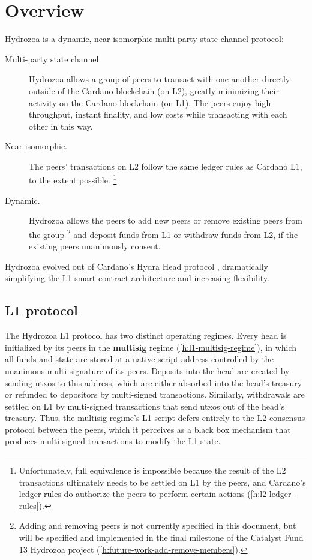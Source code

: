 \documentclass[../hydrozoa.tex]{subfiles}
\begin{document}
\chapter*{Overview}%
\label{h:overview-introduction}%
%

Hydrozoa is a dynamic, near-isomorphic multi-party state channel protocol:
\begin{description}
  \item[Multi-party state channel.] Hydrozoa allows a group of peers to transact with one another directly outside of the Cardano blockchain (on L2), greatly minimizing their activity on the Cardano blockchain (on L1).
    The peers enjoy high throughput, instant finality, and low costs while transacting with each other in this way.
  \item[Near-isomorphic.] The peers' transactions on L2 follow the same ledger rules as Cardano L1, to the extent possible.%
    \footnote{Unfortunately, full equivalence is impossible because the result of the L2 transactions ultimately needs to be settled on L1 by the peers, and Cardano's ledger rules do authorize the peers to perform certain actions (\cref{h:l2-ledger-rules}).}
  \item[Dynamic.] Hydrozoa allows the peers to add new peers or remove existing peers from the group%
    \footnote{Adding and removing peers is not currently specified in this document, but will be specified and implemented in the final milestone of the Catalyst Fund 13 Hydrozoa project \citep{FlerovskyCatalystMilestonesHydrozoa2024} (\cref{h:future-work-add-remove-members}).}
    and deposit funds from L1 or withdraw funds from L2, if the existing peers unanimously consent.
\end{description}
Hydrozoa evolved out of Cardano's Hydra Head protocol \citep{NagelEtAlHydraHeadV1Specification2024}, dramatically simplifying the L1 smart contract architecture and increasing flexibility.

\section*{L1 protocol}%
\label{h:overview-l1-protocol}%
%

The Hydrozoa L1 protocol has two distinct operating regimes.
Every head is initialized by its peers in the \textbf{multisig} regime (\cref{h:l1-multisig-regime}), in which all funds and state are stored at a native script address controlled by the unanimous multi-signature of its peers.
Deposits into the head are created by sending utxos to this address, which are either absorbed into the head's treasury or refunded to depositors by multi-signed transactions.
Similarly, withdrawals are settled on L1 by multi-signed transactions that send utxos out of the head's treasury.
Thus, the multisig regime's L1 script defers entirely to the L2 consensus protocol between the peers, which it perceives as a black box mechanism that produces multi-signed transactions to modify the L1 state.
\end{document}
